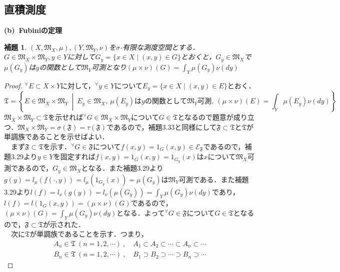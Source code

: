 \documentclass[a4paper,11pt]{jsarticle}
\newtheorem{lemma}[definition]{補題}
\newtheorem{proof}{証明}
\begin{document}
\subsection{直積測度}
{\bf (b){\ }Fubiniの定理}
\setcounter{definition}{33}
\begin{lemma}
$(X,\mathfrak{M}_X,\mu ),(Y,\mathfrak{M}_Y,\nu )$を$\sigma$-有限な測度空間とする．$G\in \mathfrak{M}_X\times\mathfrak{M}_Y,y\in Y$に対して$G_y=\{x\in X\mid (x,y)\in G\}$とおくと，$G_y\in\mathfrak{M}_X$で$\mu(G_y)$は$y$の関数として$\mathfrak{M}_Y$可測となり$(\mu\times\nu)(G)=\int_Y\mu(G_y)\nu(dy)$
\end{lemma}
\begin{proof}
$^\forall E\subset X\times Y$に対して，$^\forall y\in Y$について$E_y=\{x\in X\mid (x,y)\in E\}$とおく．
\begin{equation*}
\mathfrak{T}=\left\{E\in \mathfrak{M}_X\times\mathfrak{M}_Y{\ }\middle|{\ } E_y\in \mathfrak{M}_X,{\ }\mu(E_y) は y の関数として \mathfrak{M}_Y 可測 ,{\ }(\mu\times\nu)(E)=\int_Y\mu(E_y)\nu(dy)\right\}
\end{equation*}
$\mathfrak{M}_X\times\mathfrak{M}_Y\subset\mathfrak{T}$を示せれば$^\forall G\in\mathfrak{M}_X\times\mathfrak{M}_Y$について$G\in \mathfrak{T}$となるので題意が成り立つ．$\mathfrak{M}_X\times\mathfrak{M}_Y=\sigma(\mathfrak{F})=\tau(\mathfrak{F})$であるので，補題3.33と同様にして$\mathfrak{F}\subset\mathfrak{T}$と$\mathfrak{T}$が単調族であることを示せばよい．\\
{\ }{\ }まず$\mathfrak{F}\subset\mathfrak{T}$を示す．$^\forall G\in\mathfrak{F}$について$f(x,y)=1_G(x,y)\in \mathcal{E}_{\mathfrak{F}}$であるので，補題3.29より$y\in Y$を固定すれば$f(x,y)=1_G(x,y)=1_{G_y}(x)$は$x$について$\mathfrak{M}_X$可測であるので，$G_y\in \mathfrak{M}_X$となる．また補題3.29より$g(y)=l_\mu(f(\cdot,y))=l_\mu(1_{G_y}(x))=\mu(G_y)$は$\mathfrak{M}_Y$可測である．また補題3.29より$l(f)=l_\nu(g(y))=l_\nu(\mu(G_y))=\int_Y\mu(G_y)\nu(dy)$であり，$l(f)=l(1_G(x,y))=(\mu\times\nu )(G)$であるので，$(\mu\times\nu )(G)=\int_Y\mu(G_y)\nu(dy)$となる．よって$^\forall G\in \mathfrak{F}$について$G\in \mathfrak{T}$となるので，$\mathfrak{F}\subset \mathfrak{T}$が示された．\\
{\ }{\ }次に$\mathfrak{T}$が単調族であることを示す．つまり，
\begin{eqnarray*}
A_n\in \mathfrak{T}{\ }(n=1,2,\cdots){\ },\quad A_1\subset A_2\subset \cdots\subset A_n \subset\cdots \\
B_n\in \mathfrak{T}{\ }(n=1,2,\cdots){\ },\quad B_1\supset B_2\supset \cdots\supset B_n \supset\cdots

\end{eqnarray*}
\end{proof}
\end{document}
